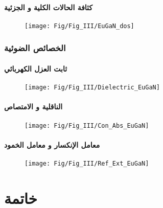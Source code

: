\subsubsection{كثافة الحالات الكلية و الجزئية}
\begin{figure}[h!]
	\centering
	\texttt{[image: Fig/Fig\_III/EuGaN\_dos]}
	\caption{}
	\label{fig:eugandos}
\end{figure}
\FloatBarrier
\subsection{الخصائص الضوئية}
\subsubsection{ثابت العزل الكهربائي }
\begin{figure}[h!]
	\centering
	\texttt{[image: Fig/Fig\_III/Dielectric\_EuGaN]}
	\caption{}
	\label{fig:dielectriceugan}
\end{figure}
\FloatBarrier
\subsubsection{الناقلية و الامتصاص}
\begin{figure}[h!]
	\centering
	\texttt{[image: Fig/Fig\_III/Con\_Abs\_EuGaN]}
	\caption{}
	\label{fig:conabseugan}
\end{figure}
\FloatBarrier
\subsubsection{معامل الإنكسار و معامل الخمود}
\begin{figure}[h!]
	\centering
	\texttt{[image: Fig/Fig\_III/Ref\_Ext\_EuGaN]}
	\caption{}
	\label{fig:refexteugan}
\end{figure}
\FloatBarrier
\chapter*{  خاتمة }